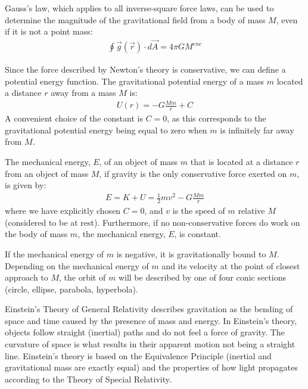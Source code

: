 \begin{chapterSummary}
Gauss's law, which applies to all inverse-square force laws, can be used to determine the magnitude of the gravitational field from a body of mass $M$, even if it is not a point mass:
\begin{align*}
\oint \vec g(\vec r) \cdot d\vec A = 4\pi G M^{enc}
\end{align*}

Since the force described by Newton's theory is conservative, we can define a potential energy function. The gravitational potential energy of a mass $m$ located a distance $r$ away from a mass $M$ is:
\begin{align*}
U(r) = -G\frac{Mm}{r} + C
\end{align*}
A convenient choice of the constant is $C=0$, as this corresponds to the gravitational potential energy being equal to zero when $m$ is infinitely far away from $M$.

The mechanical energy, $E$, of an object of mass $m$ that is located at a distance $r$ from an object of mass $M$, if gravity is the only conservative force exerted on $m$, is given by:
\begin{align*}
E = K + U = \frac{1}{2}mv^2 - G\frac{Mm}{r}
\end{align*}
where we have explicitly chosen $C=0$, and $v$ is the speed of $m$ relative $M$ (considered to be at rest). Furthermore, if no non-conservative forces do work on the body of mass $m$, the mechanical energy, $E$, is constant.

If the mechanical energy of $m$ is negative, it is gravitationally bound to $M$. Depending on the mechanical energy of $m$ and its velocity at the point of closest approach to $M$, the orbit of $m$ will be described by one of four conic sections (circle, ellipse, parabola, hyperbola).

Einstein's Theory of General Relativity describes gravitation as the bending of space and time caused by the presence of mass and energy. In Einstein's theory, objects follow straight (inertial) paths and do not feel a force of gravity. The curvature of space is what results in their apparent motion not being a straight line. Einstein's theory is based on the Equivalence Principle (inertial and gravitational mass are exactly equal) and the properties of how light propagates according to the Theory of Special Relativity.
\end{chapterSummary}
\newpage
